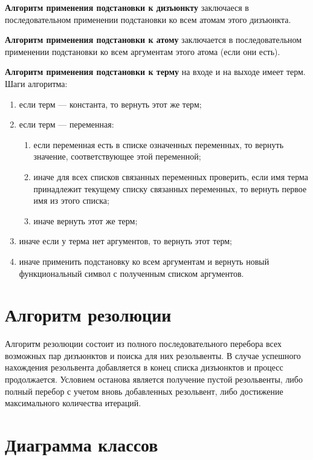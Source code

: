 \textbf{Алгоритм применения подстановки к дизъюнкту} заключаеся в последовательном применении подстановки ко всем атомам этого дизъюнкта.

\textbf{Алгоритм применения подстановки к атому} заключается в последовательном применении подстановки ко всем аргументам этого атома (если они есть).

\textbf{Алгоритм применения подстановки к терму} на входе и на выходе имеет терм. Шаги алгоритма:

\begin{enumerate}
    \item если терм --- константа, то вернуть этот же терм;
    \item если терм --- переменная:
    \begin{enumerate}
        \item если переменная есть в списке означенных переменных, то вернуть значение, соответствующее этой переменной;
        \item иначе для всех списков связанных переменных проверить, если имя терма принадлежит текущему списку связанных переменных, то вернуть первое имя из этого списка;
        \item иначе вернуть этот же терм;
    \end{enumerate}
    \item иначе если у терма нет аргументов, то вернуть этот терм;
    \item иначе применить подстановку ко всем аргументам и вернуть новый функциональный символ с полученным списком аргументов.
\end{enumerate}

\section{Алгоритм резолюции}

Алгоритм резолюции состоит из полного последовательного перебора всех возможных пар дизъюнктов и поиска для них резольвенты. В случае успешного нахождения резольвента добавляется в конец списка дизъюнктов и процесс продолжается. Условием останова является получение пустой резольвенты, либо полный перебор с учетом вновь добавленных резольвент, либо достижение максимального количества итераций.

\section{Диаграмма классов}

